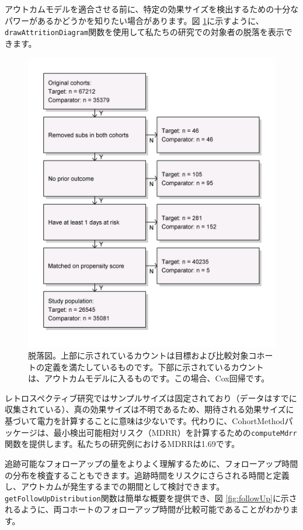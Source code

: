 \documentclass[
  11pt]{book}
\theoremstyle{definition}
\theoremstyle{definition}
\theoremstyle{definition}
\theoremstyle{definition}
\theoremstyle{remark}
\begin{document}
アウトカムモデルを適合させる前に、特定の効果サイズを検出するための十分なパワーがあるかどうかを知りたい場合があります。図 \ref{fig:attrition}に示すように、\texttt{drawAttritionDiagram}関数を使用して私たちの研究での対象者の脱落を表示できます。 

\begin{figure}

{\centering \includegraphics[width=0.7\linewidth]{images/PopulationLevelEstimation/attrition} 

}

\caption{脱落図。上部に示されているカウントは目標および比較対象コホートの定義を満たしているものです。下部に示されているカウントは、アウトカムモデルに入るものです。この場合、Cox回帰です。}\label{fig:attrition}
\end{figure}

レトロスペクティブ研究ではサンプルサイズは固定されており（データはすでに収集されている）、真の効果サイズは不明であるため、期待される効果サイズに基づいて電力を計算することに意味は少ないです。代わりに、CohortMethodパッケージは、最小検出可能相対リスク（MDRR）を計算するための\texttt{computeMdrr}関数を提供します。私たちの研究例におけるMDRRは1.69です。  

追跡可能なフォローアップの量をよりよく理解するために、フォローアップ時間の分布を検査することもできます。追跡時間をリスクにさらされる時間と定義し、アウトカムが発生するまでの期間として検討できます。\texttt{getFollowUpDistribution}関数は簡単な概要を提供でき、図 \ref{fig:followUp}に示されるように、両コホートのフォローアップ時間が比較可能であることがわかります。
\end{document}

